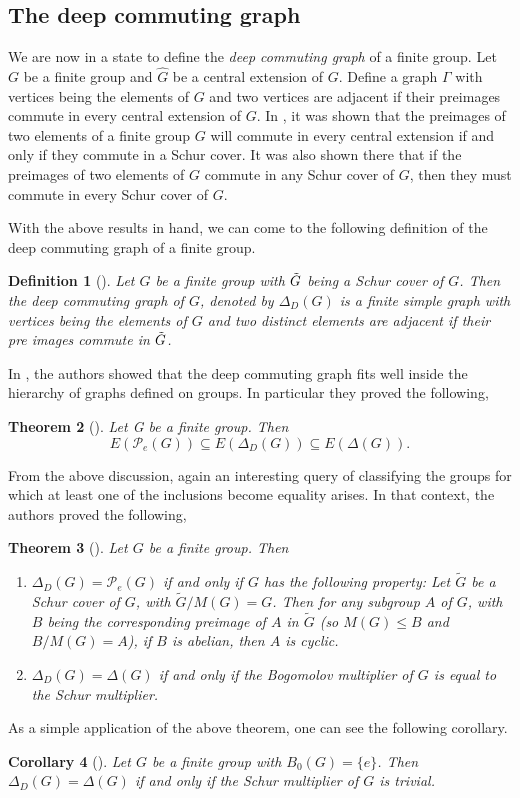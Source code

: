 \documentclass[12pt,a4paper]{article}
\newtheorem{theorem}{Theorem}[section]
\newtheorem{corollary}[theorem]{Corollary}
\newtheorem{definition}[theorem]{Definition}
\begin{document}
\subsection{The deep commuting graph}

We are now in a state to define the \textit{deep commuting graph} of a finite group. Let $G$ be a finite group and $\hat{G}$ be a central extension of $G$. Define a graph $\Gamma$ with vertices being the elements of $G$ and two vertices are adjacent if their preimages commute in every central extension of $G$. In \cite[Theorem 4.1]{deepc}, it was shown that the preimages of two elements of a finite group $G$ will commute in every central extension if and only if they commute in a Schur cover. It was also shown there that if the preimages of two elements of $G$ commute in any Schur cover of $G$, then they must commute in every Schur cover of $G$.

With the above results in hand, we can come to the following definition of the deep commuting graph of a finite group. 
\begin{definition}[\cite{deepc}]\label{deep_commuting}
Let $G$ be a finite group with $\Tilde{G}$ being a Schur cover of $G$. Then the \textit{deep commuting graph} of $G$, denoted by $\Delta_D(G)$ is a finite simple graph with vertices being the elements of $G$ and two distinct elements are adjacent if their pre images commute in $\Tilde{G}$.     
\end{definition}
In \cite{deepc}, the authors showed that the deep commuting graph fits well inside the hierarchy of graphs defined on groups. In particular they proved the following, 
\begin{theorem}[\cite{deepc}]\label{inclusion}
    Let G be a finite group. Then
    \[
    E(\mathcal{P}_e(G))\subseteq E(\Delta_D(G)) \subseteq E(\Delta(G)).
    \]
\end{theorem}

From the above discussion, again an interesting query of classifying the groups for which at least one of the inclusions become equality arises. In that context, the authors proved the following,
\begin{theorem}[\cite{deepc}]\label{equality} Let $G$ be a finite group. Then
\begin{enumerate}[\rm (i)]
    \item $\Delta_D(G)=\mathcal{P}_e(G)$ if and only if $G$ has the following property: Let $\tilde{G}$ be a Schur cover of $G$, with $\tilde{G}/M(G)=G$. Then for any subgroup $A$ of $G$, with $B$ being the corresponding preimage of $A$ in $\tilde{G}$ (so $M(G)\leq B$ and $B/M(G)=A$), if $B$ is abelian, then $A$ is cyclic.
    \item $\Delta_D(G)=\Delta(G)$ if and only if the Bogomolov multiplier of $G$ is equal to the Schur multiplier.
\end{enumerate}
\end{theorem}
As a simple application of the above theorem, one can see the following corollary.
\begin{corollary}[\cite{deepc}]\label{bogomolov_trivial}
Let $G$ be a finite group with $B_0(G)=\{e\}$. Then $\Delta_D(G)=\Delta(G)$ if and
only if the Schur multiplier of $G$ is trivial.
\end{corollary}
\end{document}
